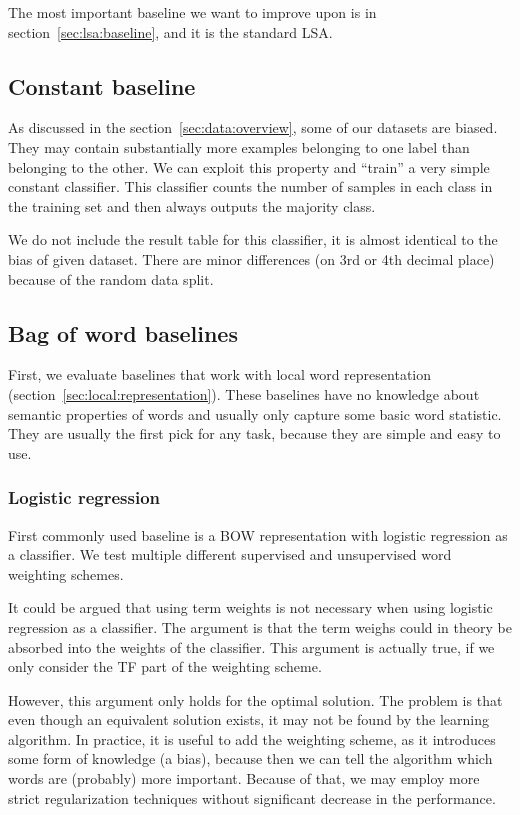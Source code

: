     The most important baseline we want to improve upon is in section~\ref{sec:lsa:baseline}, 
    and it is the standard LSA.

    \subsection{Constant baseline}
    
    As discussed in the section~\ref{sec:data:overview}, some of our datasets are biased. 
    They may contain substantially more examples belonging to one label than belonging to the other.
    We can exploit this property and ``train'' a very simple constant classifier. 
    This classifier counts the number of samples in each class in the training set and then always outputs the majority class.
    
    We do not include the result table for this classifier, it is almost identical to the bias of given dataset.
    There are minor differences (on 3rd or 4th decimal place) because of the random data split. 

    \subsection{Bag of word baselines}
    
    First, we evaluate baselines that work with local word representation (section~\ref{sec:local:representation}).
    These baselines have no knowledge about semantic properties of words and usually only capture some basic word statistic.
    They are usually the first pick for any task, because they are simple and easy to use. 
    
    \subsubsection{Logistic regression}
    
    First commonly used baseline is a BOW representation with logistic regression as a classifier. 
    We test multiple different supervised and unsupervised word weighting schemes.
    
    It could be argued that using term weights is not necessary when using logistic regression as a classifier.
    The argument is that the term weighs could in theory be absorbed into the weights of the classifier. 
    This argument is actually true, if we only consider the TF part of the weighting scheme.
    
    However, this argument only holds for the optimal solution. 
    The problem is that even though an equivalent solution exists, it may not be found by the learning algorithm. 
    In practice, it is useful to add the weighting scheme, 
    as it introduces some form of knowledge (a bias), 
    because then we can tell the algorithm which words are (probably) more important.
    Because of that, we may employ more strict regularization techniques without significant decrease in the performance.
    


